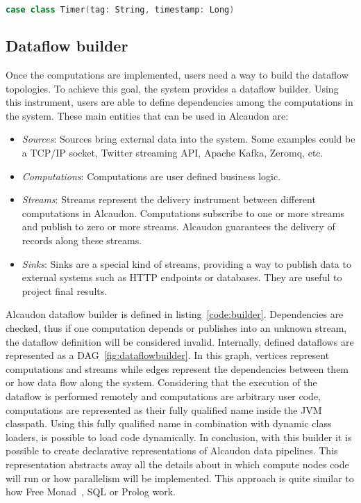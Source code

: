\begin{lstlisting}[language=scala, frame=trBL, label=code:timers, float=ht, caption = {Timer class}]
  case class Timer(tag: String, timestamp: Long)
\end{lstlisting}

\subsection{Dataflow builder}

Once the computations are implemented, users need a way to build the dataflow topologies.
To achieve this goal, the system provides a dataflow builder. Using this instrument,
users are able to define dependencies among the computations in the system.
These main entities that can be used in Alcaudon are:

\begin{itemize}
  \item \textit{Sources}: Sources bring external data into the system. Some
    examples could be a TCP/IP socket, Twitter streaming API, Apache Kafka,
    Zeromq, etc.
  \item \textit{Computations}: Computations are user defined business logic.
  \item \textit{Streams}: Streams represent the delivery instrument between
    different computations in Alcaudon. Computations subscribe to one or more
    streams and publish to zero or more streams. Alcaudon guarantees the
    delivery of records along these streams.
  \item \textit{Sinks}: Sinks are a special kind of streams, providing a way to
    publish data to external systems such as HTTP endpoints or databases. They
    are useful to project final results.
\end{itemize}

Alcaudon dataflow builder is defined in listing~\ref{code:builder}. Dependencies
are checked, thus if one computation depends or publishes into an unknown stream,
the dataflow definition will be considered invalid. Internally, defined
dataflows are represented as a \acs{DAG}~\ref{fig:dataflowbuilder}. In this graph, vertices
represent computations and streams while edges represent the dependencies
between them or how data flow along the system. Considering that the execution
of the dataflow is performed remotely and computations are arbitrary user code,
computations are represented as their fully qualified name inside the \acs{JVM}
classpath. Using this fully qualified name in combination with dynamic class
loaders, is possible to load code dynamically. In conclusion, with this builder
it is possible to create declarative representations of Alcaudon data pipelines.
This representation abstracts away all the details about in which compute nodes
code will run or how parallelism will be implemented. This approach is quite
similar to how Free Monad~\cite{freemonad}, SQL or Prolog work.

